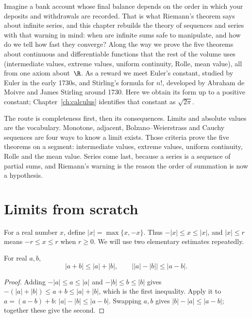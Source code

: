 Imagine a bank account whose final balance depends on the order in which your deposits and withdrawals are recorded. That is what Riemann's theorem
says about infinite series, and this chapter rebuilds the theory of sequences and series with that warning in mind: when are infinite sums safe to
manipulate, and how do we tell how fast they converge? Along the way we prove the five theorems about continuous and differentiable functions that
the rest of the volume uses (intermediate values, extreme values, uniform continuity, Rolle, mean value), all from one axiom about~$\R$. As a reward we
meet Euler's constant, studied by Euler in the early 1730s, and Stirling's formula for $n!$, developed by Abraham de Moivre and James Stirling around 1730. Here we obtain its form up to a positive constant;
Chapter~\ref{ch:calculus} identifies that constant as $\sqrt{2\pi}$.

The route is completeness first, then its consequences. Limits and absolute values are the vocabulary. Monotone, adjacent, Bolzano--Weierstrass and Cauchy sequences are four ways to know a limit exists. Those criteria prove the five theorems on a segment: intermediate values, extreme values, uniform continuity, Rolle and the mean value. Series come last, because a series is a sequence of partial sums, and Riemann's warning is the reason the order of summation is now a hypothesis.


\section{Limits from scratch}

For a real number $x$, define $|x|=\max\{x,-x\}$. Thus
$-|x|\le x\le|x|$, and $|x|\le r$ means $-r\le x\le r$ when $r\ge0$.
We will use two elementary estimates repeatedly.

\begin{proposition}\label{prop:real-triangle}
For real $a,b$,
\[
|a+b|\le|a|+|b|,\qquad \bigl||a|-|b|\bigr|\le|a-b|.
\]
\end{proposition}
\begin{proof}
Adding $-|a|\le a\le|a|$ and $-|b|\le b\le|b|$ gives
$-(|a|+|b|)\le a+b\le|a|+|b|$, which is the first inequality.
Apply it to $a=(a-b)+b$: $|a|-|b|\le|a-b|$.
Swapping $a,b$ gives $|b|-|a|\le|a-b|$; together these give the second.
\end{proof}

